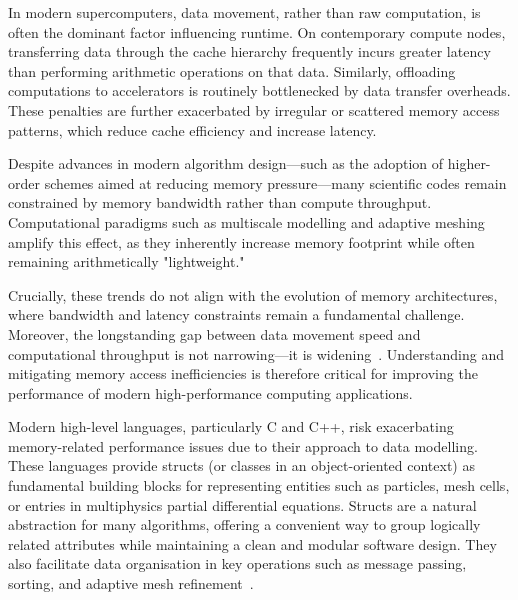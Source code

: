 
In modern supercomputers, data movement, rather than raw computation, is often the dominant factor influencing runtime. On contemporary compute nodes, transferring data through the cache hierarchy frequently incurs greater latency than performing arithmetic operations on that data. Similarly, offloading computations to accelerators is routinely bottlenecked by data transfer overheads. These penalties are further exacerbated by irregular or scattered memory access patterns, which reduce cache efficiency and increase latency.

Despite advances in modern algorithm design—such as the adoption of higher-order schemes aimed at reducing memory pressure—many scientific codes remain constrained by memory bandwidth rather than compute throughput. Computational paradigms such as multiscale modelling and adaptive meshing amplify this effect, as they inherently increase memory footprint while often remaining arithmetically "lightweight."

Crucially, these trends do not align with the evolution of memory architectures, where bandwidth and latency constraints remain a fundamental challenge. Moreover, the longstanding gap between data movement speed and computational throughput is not narrowing—it is widening~\cite{Dongarra:2011:ExascaleSoftwareRoadmap}. Understanding and mitigating memory access inefficiencies is therefore critical for improving the performance of modern high-performance computing applications.

Modern high-level languages, particularly C and C++, risk exacerbating memory-related performance issues due to their approach to data modelling. These languages provide structs (or classes in an object-oriented context) as fundamental building blocks for representing entities such as particles, mesh cells, or entries in multiphysics partial differential equations. Structs are a natural abstraction for many algorithms, offering a convenient way to group logically related attributes while maintaining a clean and modular software design. They also facilitate data organisation in key operations such as message passing, sorting, and adaptive mesh refinement~\cite{Hirzel:2007:DataLayoutForOO,Homann:2018:SoAx,Reinders:2016:XeonPhi,Jubertie:2018:DataLayoutAbstractionLayers}.

